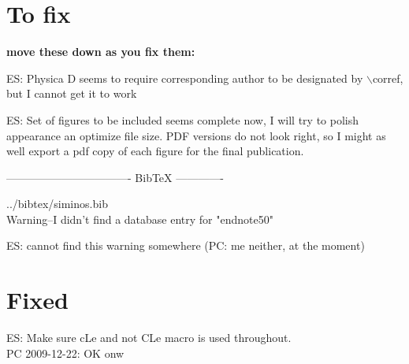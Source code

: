 
\section*{To fix}

{\bf move these down as you fix them:}

ES: Physica D seems to require corresponding author to be
designated by $\backslash$corref, but I cannot get it to work

ES: Set of figures to be included seems complete now, I will
try to polish appearance an optimize file size. PDF versions
do not look right, so I might as well export a pdf copy of
each figure for the final publication.


---------------------------------- BibTeX -------------

../bibtex/siminos.bib
\\
Warning--I didn't find a database entry for "endnote50"

ES: cannot find this warning somewhere
(PC: me neither, at the moment)

\section*{Fixed}

ES: Make sure cLe and not CLe macro is used throughout.
\\
PC 2009-12-22: OK onw
